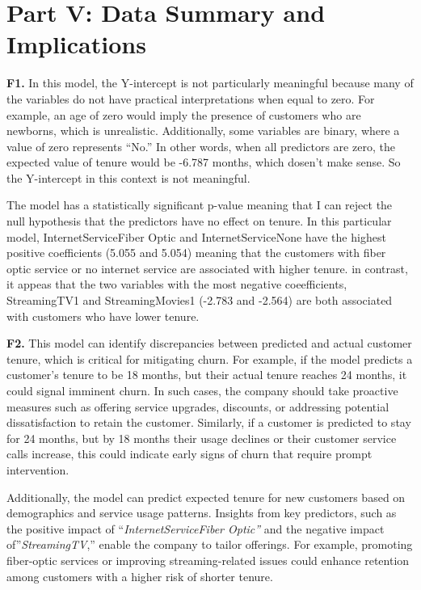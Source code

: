 \documentclass[
]{article}
\begin{document}
\section{Part V: Data Summary and
Implications}\label{part-v-data-summary-and-implications}

\textbf{F1.} In this model, the Y-intercept is not particularly
meaningful because many of the variables do not have practical
interpretations when equal to zero. For example, an age of zero would
imply the presence of customers who are newborns, which is unrealistic.
Additionally, some variables are binary, where a value of zero
represents ``No.'' In other words, when all predictors are zero, the
expected value of tenure would be -6.787 months, which dosen't make
sense. So the Y-intercept in this context is not meaningful.

The model has a statistically significant p-value meaning that I can
reject the null hypothesis that the predictors have no effect on tenure.
In this particular model, InternetServiceFiber Optic and
InternetServiceNone have the highest positive coefficients (5.055 and
5.054) meaning that the customers with fiber optic service or no
internet service are associated with higher tenure. in contrast, it
appeas that the two variables with the most negative coeefficients,
StreamingTV1 and StreamingMovies1 (-2.783 and -2.564) are both
associated with customers who have lower tenure.

\textbf{F2.} This model can identify discrepancies between predicted and
actual customer tenure, which is critical for mitigating churn. For
example, if the model predicts a customer's tenure to be 18 months, but
their actual tenure reaches 24 months, it could signal imminent churn.
In such cases, the company should take proactive measures such as
offering service upgrades, discounts, or addressing potential
dissatisfaction to retain the customer. Similarly, if a customer is
predicted to stay for 24 months, but by 18 months their usage declines
or their customer service calls increase, this could indicate early
signs of churn that require prompt intervention.

Additionally, the model can predict expected tenure for new customers
based on demographics and service usage patterns. Insights from key
predictors, such as the positive impact of ``\emph{InternetServiceFiber
Optic''} and the negative impact of''\emph{StreamingTV},'' enable the
company to tailor offerings. For example, promoting fiber-optic services
or improving streaming-related issues could enhance retention among
customers with a higher risk of shorter tenure.
\end{document}
